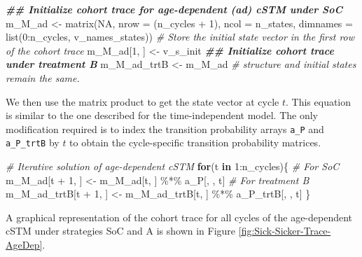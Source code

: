 \documentclass[
]{article}
\newenvironment{Shaded}{\begin{snugshade}}{\end{snugshade}}
\newcommand{\AttributeTok}[1]{\textcolor[rgb]{0.77,0.63,0.00}{#1}}
\newcommand{\CommentTok}[1]{\textcolor[rgb]{0.56,0.35,0.01}{\textit{#1}}}
\newcommand{\ConstantTok}[1]{\textcolor[rgb]{0.00,0.00,0.00}{#1}}
\newcommand{\ControlFlowTok}[1]{\textcolor[rgb]{0.13,0.29,0.53}{\textbf{#1}}}
\newcommand{\DecValTok}[1]{\textcolor[rgb]{0.00,0.00,0.81}{#1}}
\newcommand{\DocumentationTok}[1]{\textcolor[rgb]{0.56,0.35,0.01}{\textbf{\textit{#1}}}}
\newcommand{\FunctionTok}[1]{\textcolor[rgb]{0.00,0.00,0.00}{#1}}
\newcommand{\NormalTok}[1]{#1}
\newcommand{\OtherTok}[1]{\textcolor[rgb]{0.56,0.35,0.01}{#1}}
\newcommand{\SpecialCharTok}[1]{\textcolor[rgb]{0.00,0.00,0.00}{#1}}
\begin{document}
\begin{Shaded}
\begin{Highlighting}[]
\DocumentationTok{\#\# Initialize cohort trace for age{-}dependent (ad) cSTM under SoC}
\NormalTok{m\_M\_ad }\OtherTok{\textless{}{-}} \FunctionTok{matrix}\NormalTok{(}\ConstantTok{NA}\NormalTok{, }
                 \AttributeTok{nrow =}\NormalTok{ (n\_cycles }\SpecialCharTok{+} \DecValTok{1}\NormalTok{), }\AttributeTok{ncol =}\NormalTok{ n\_states, }
                 \AttributeTok{dimnames =} \FunctionTok{list}\NormalTok{(}\DecValTok{0}\SpecialCharTok{:}\NormalTok{n\_cycles, v\_names\_states))}
\CommentTok{\# Store the initial state vector in the first row of the cohort trace}
\NormalTok{m\_M\_ad[}\DecValTok{1}\NormalTok{, ] }\OtherTok{\textless{}{-}}\NormalTok{ v\_s\_init}
\DocumentationTok{\#\# Initialize cohort trace under treatment B}
\NormalTok{m\_M\_ad\_trtB }\OtherTok{\textless{}{-}}\NormalTok{ m\_M\_ad }\CommentTok{\# structure and initial states remain the same.}
\end{Highlighting}
\end{Shaded}

We then use the matrix product to get the state vector at cycle \(t\). This equation is similar to the one described for the time-independent model. The only modification required is to index the transition probability arrays \texttt{a\_P} and \texttt{a\_P\_trtB} by \(t\) to obtain the cycle-specific transition probability matrices.

\begin{Shaded}
\begin{Highlighting}[]
\CommentTok{\# Iterative solution of age{-}dependent cSTM}
\ControlFlowTok{for}\NormalTok{(t }\ControlFlowTok{in} \DecValTok{1}\SpecialCharTok{:}\NormalTok{n\_cycles)\{}
  \CommentTok{\# For SoC}
\NormalTok{  m\_M\_ad[t }\SpecialCharTok{+} \DecValTok{1}\NormalTok{, ] }\OtherTok{\textless{}{-}}\NormalTok{ m\_M\_ad[t, ] }\SpecialCharTok{\%*\%}\NormalTok{ a\_P[, , t]}
  \CommentTok{\# For treatment B}
\NormalTok{  m\_M\_ad\_trtB[t }\SpecialCharTok{+} \DecValTok{1}\NormalTok{, ] }\OtherTok{\textless{}{-}}\NormalTok{ m\_M\_ad\_trtB[t, ] }\SpecialCharTok{\%*\%}\NormalTok{ a\_P\_trtB[, , t]}
\NormalTok{\}}
\end{Highlighting}
\end{Shaded}

A graphical representation of the cohort trace for all cycles of the age-dependent cSTM under strategies SoC and A is shown in Figure \ref{fig:Sick-Sicker-Trace-AgeDep}.
\end{document}

